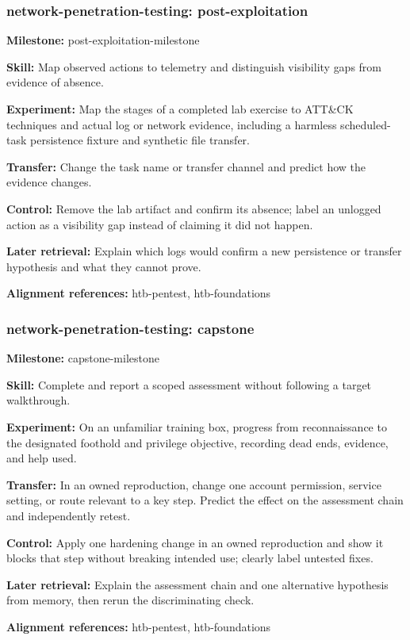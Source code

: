 \subsubsection{network-penetration-testing: post-exploitation}
\noindent\textbf{Milestone:} post-exploitation-milestone\par
\noindent\textbf{Skill:} Map observed actions to telemetry and distinguish visibility gaps from evidence of absence.\par
\noindent\textbf{Experiment:} Map the stages of a completed lab exercise to ATT\&CK techniques and actual log or network evidence, including a harmless scheduled-task persistence fixture and synthetic file transfer.\par
\noindent\textbf{Transfer:} Change the task name or transfer channel and predict how the evidence changes.\par
\noindent\textbf{Control:} Remove the lab artifact and confirm its absence; label an unlogged action as a visibility gap instead of claiming it did not happen.\par
\noindent\textbf{Later retrieval:} Explain which logs would confirm a new persistence or transfer hypothesis and what they cannot prove.\par
\noindent\textbf{Alignment references:} htb-pentest, htb-foundations\par
\subsubsection{network-penetration-testing: capstone}
\noindent\textbf{Milestone:} capstone-milestone\par
\noindent\textbf{Skill:} Complete and report a scoped assessment without following a target walkthrough.\par
\noindent\textbf{Experiment:} On an unfamiliar training box, progress from reconnaissance to the designated foothold and privilege objective, recording dead ends, evidence, and help used.\par
\noindent\textbf{Transfer:} In an owned reproduction, change one account permission, service setting, or route relevant to a key step. Predict the effect on the assessment chain and independently retest.\par
\noindent\textbf{Control:} Apply one hardening change in an owned reproduction and show it blocks that step without breaking intended use; clearly label untested fixes.\par
\noindent\textbf{Later retrieval:} Explain the assessment chain and one alternative hypothesis from memory, then rerun the discriminating check.\par
\noindent\textbf{Alignment references:} htb-pentest, htb-foundations\par
